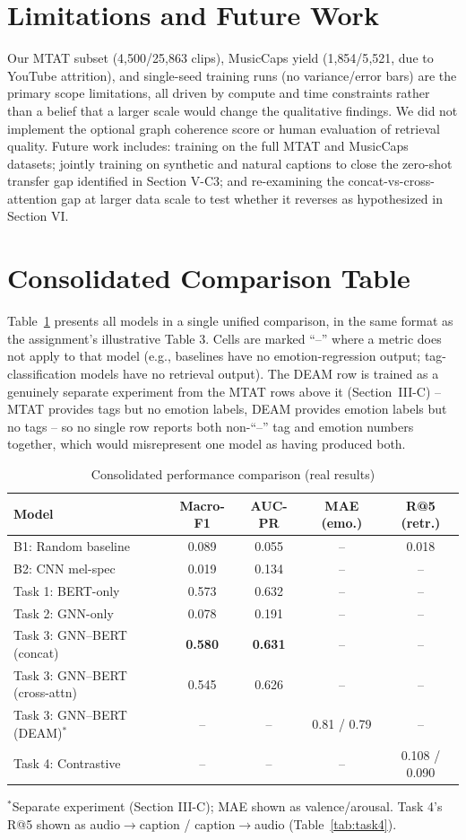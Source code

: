 \documentclass[conference]{IEEEtran}
\begin{document}
\section{Limitations and Future Work}
Our MTAT subset (4{,}500/25{,}863 clips), MusicCaps yield (1{,}854/5{,}521,
due to YouTube attrition), and single-seed training runs (no
variance/error bars) are the primary scope limitations, all driven by
compute and time constraints rather than a belief that a larger scale
would change the qualitative findings. We did not implement the
optional graph coherence score or human evaluation of retrieval
quality. Future work includes: training on the full MTAT and MusicCaps
datasets; jointly training on synthetic and natural captions to close
the zero-shot transfer gap identified in Section V-C3; and
re-examining the concat-vs-cross-attention gap at larger data scale to
test whether it reverses as hypothesized in Section VI.
\section{Consolidated Comparison Table}
Table~\ref{tab:consolidated} presents all models in a single unified
comparison, in the same format as the assignment's illustrative Table 3.
Cells are marked ``--'' where a metric does not apply to that model
(e.g., baselines have no emotion-regression output; tag-classification
models have no retrieval output). The DEAM row is trained as a
genuinely separate experiment from the MTAT rows above it (Section~III-C)
-- MTAT provides tags but no emotion labels, DEAM provides emotion
labels but no tags -- so no single row reports both non-``--'' tag and
emotion numbers together, which would misrepresent one model as having
produced both.

\begin{table}[h]
\centering
\caption{Consolidated performance comparison (real results)}
\label{tab:consolidated}
\small
\begin{tabular}{lcccc}
\toprule
Model & Macro-F1 & AUC-PR & MAE (emo.) & R@5 (retr.) \\
\midrule
B1: Random baseline & 0.089 & 0.055 & -- & 0.018 \\
B2: CNN mel-spec & 0.019 & 0.134 & -- & -- \\
Task 1: BERT-only & 0.573 & 0.632 & -- & -- \\
Task 2: GNN-only & 0.078 & 0.191 & -- & -- \\
Task 3: GNN--BERT (concat) & \textbf{0.580} & \textbf{0.631} & -- & -- \\
Task 3: GNN--BERT (cross-attn) & 0.545 & 0.626 & -- & -- \\
Task 3: GNN--BERT (DEAM)$^*$ & -- & -- & 0.81 / 0.79 & -- \\
Task 4: Contrastive & -- & -- & -- & 0.108 / 0.090 \\
\bottomrule
\end{tabular}

\vspace{2pt}
{\footnotesize $^*$Separate experiment (Section III-C); MAE shown as
valence/arousal. Task 4's R@5 shown as audio$\to$caption /
caption$\to$audio (Table~\ref{tab:task4}).}
\end{table}
\end{document}
